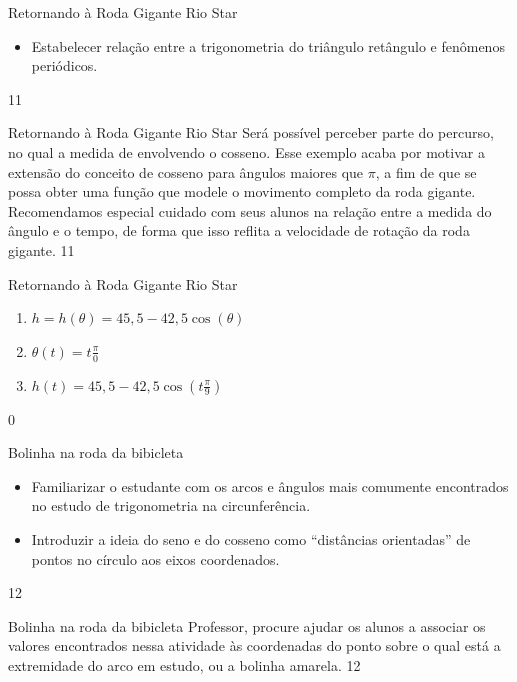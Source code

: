 \begin{objectives}{Retornando à Roda Gigante Rio Star}
{
\begin{itemize}
\item Estabelecer relação entre a trigonometria do triângulo retângulo e fenômenos periódicos.
\end{itemize}
}{1}{1}
\end{objectives}
\begin{sugestions}{Retornando à Roda Gigante Rio Star}
{
Será possível perceber parte do percurso, no qual a medida de envolvendo o cosseno. Esse exemplo acaba por motivar a extensão do conceito de cosseno para ângulos maiores que $\pi$, a fim de que se possa obter uma função que modele o movimento completo da roda gigante. Recomendamos especial cuidado com seus alunos na relação entre a medida do ângulo e o tempo, de forma que isso reflita a velocidade de rotação da roda gigante.
}{1}1{}
\end{sugestions}
\begin{answer}{Retornando à Roda Gigante Rio Star}
{
\begin{enumerate}
\item $h=h(\theta)=45{,}5-42{,}5\cos(\theta)$
\item $\theta(t)=t\frac{\pi}{0}$
\item $h(t)=45{,}5-42{,}5\cos(t\frac{\pi}{9})$
\end{enumerate}
}{0}
\end{answer}
\clearmargin
\begin{objectives}{Bolinha na roda da bibicleta}
{
\begin{itemize}
\item Familiarizar o estudante com os arcos e ângulos mais comumente encontrados no estudo de trigonometria na circunferência.
\item Introduzir a ideia do seno e do cosseno como “distâncias orientadas”{} de pontos no círculo aos eixos coordenados.
\end{itemize}
}{1}{2}
\end{objectives}
\begin{sugestions}{Bolinha na roda da bibicleta}
{
Professor, procure ajudar os alunos a associar os valores encontrados nessa atividade às coordenadas do ponto sobre o qual está a extremidade do arco em estudo, ou a bolinha amarela.
}{1}{2}
\end{sugestions}
\clearmargin
